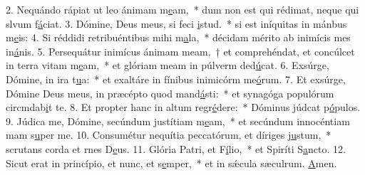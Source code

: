 2. Nequándo rápiat ut leo ánimam m\uline{e}am,~* dum non est qui rédimat, neque qui slvum f\uline{á}ciat.
3. Dómine, Deus meus, si feci \uline{i}stud.~* si est iníquitas in mánbus m\uline{e}is:
4. Si réddidi retribuéntibus mihi m\uline{a}la,~* décidam mérito ab inimícis mes in\uline{á}nis.
5. Persequátur inimícus ánimam meam,~† et comprehéndat, et concúlcet in terra vitam m\uline{e}am,~* et glóriam meam in púlverm ded\uline{ú}cat.
6. Exsúrge, Dómine, in ira t\uline{u}a:~* et exaltáre in fínibus inimicórm me\uline{ó}rum.
7. Et exsúrge, Dómine Deus meus, in præcépto quod mand\uline{á}sti:~* et synagóga populórum circmdab\uline{i}t te.
8. Et propter hanc in altum regr\uline{é}dere:~* Dóminus júdcat p\uline{ó}pulos.
9. Júdica me, Dómine, secúndum justítiam m\uline{e}am,~* et secúndum innocéntiam mam s\uline{u}per me.
10. Consumétur nequítia peccatórum, et díriges j\uline{u}stum,~* scrutans corda et rnes D\uline{e}us.
11. Glória Patri, et F\uline{í}lio,~* et Spiríti S\uline{a}ncto.
12. Sicut erat in princípio, et nunc, et s\uline{e}mper,~* et in sǽcula sæculrum. \uline{A}men.

